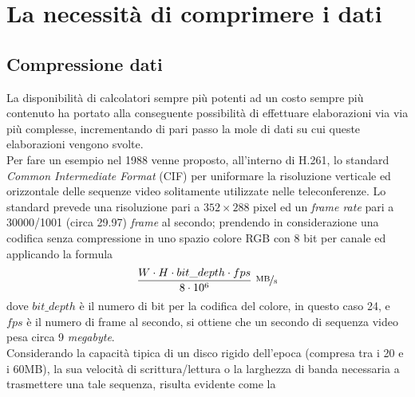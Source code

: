 
\chapter{La necessità di comprimere i dati} %

\label{Chapter3}



\section{Compressione dati}
La disponibilità di calcolatori sempre più potenti ad un costo sempre più
contenuto ha portato alla conseguente possibilità di effettuare elaborazioni
via via più complesse, incrementando di pari passo la mole di dati su cui
queste elaborazioni vengono svolte. \\
Per fare un esempio nel 1988 venne proposto, all'interno di H.261, lo standard
\emph{Common Intermediate Format} (CIF) per uniformare la risoluzione verticale
ed orizzontale delle sequenze video solitamente utilizzate nelle teleconferenze.
Lo standard prevede una risoluzione pari a $352{\times}288$ pixel ed un
\emph{frame rate} pari a 30000/1001 (circa 29.97) \emph{frame} al secondo;
prendendo in considerazione una codifica senza compressione in uno spazio
colore RGB con 8 bit per canale ed applicando la formula
\begin{align*}
  \frac{W \cdot H \cdot bit\_depth\cdot fps} 
  {8\cdot10^6} \ \nicefrac{\text{MB}}{\text{s}}
\end{align*}%
dove $bit\_depth$ è il numero di bit per la codifica del colore, in questo caso 
24, e $fps$ è il numero di frame al secondo,
si ottiene che un secondo di sequenza video pesa circa 9 \emph{megabyte}. \\
Considerando la capacità tipica di un disco rigido dell'epoca (compresa
tra i 20 e i 60MB), la sua velocità di scrittura/lettura o la larghezza di 
banda necessaria a trasmettere una tale sequenza, risulta evidente come la 
